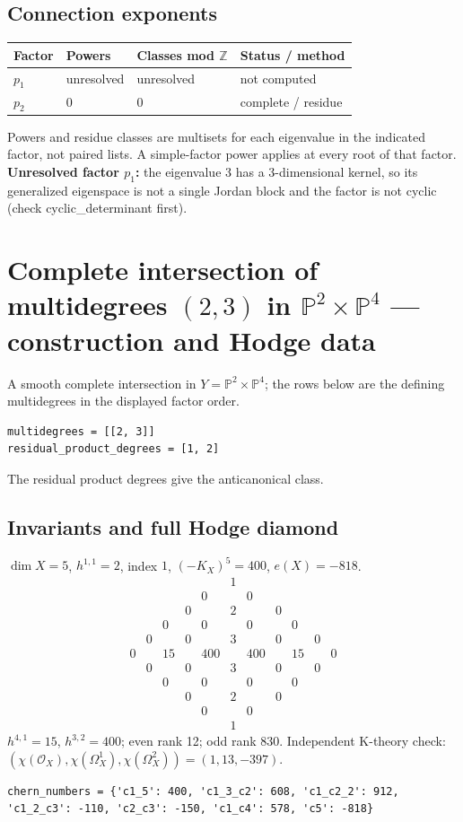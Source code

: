 \documentclass[10pt,a4paper]{article}
\begin{document}
\subsection*{Connection exponents}
\begin{center}\begin{tabular}{llll}\toprule Factor & Powers & Classes mod $\mathbb Z$ & Status / method\\\midrule
$p_{1}$ & unresolved & unresolved & not computed\\
$p_{2}$ & $0$ & $0$ & complete / residue\\
\bottomrule\end{tabular}\end{center}
Powers and residue classes are multisets for each eigenvalue in the indicated factor, not paired lists. A simple-factor power applies at every root of that factor.
\textbf{Unresolved factor $p_{1}$:} the eigenvalue 3 has a 3-dimensional kernel, so its generalized eigenspace is not a single Jordan block and the factor is not cyclic (check cyclic\_determinant first).
\clearpage\section*{Complete intersection of multidegrees $(2,3)$ in $\mathbb P^{2}\times \mathbb P^{4}$ --- construction and Hodge data}\label{entry:PROD5-A02}
A smooth complete intersection in $Y=\mathbb P^{2}\times\mathbb P^{4}$; the rows below are the defining multidegrees in the displayed factor order.
\begin{lstlisting}
multidegrees = [[2, 3]]
residual_product_degrees = [1, 2]
\end{lstlisting}
The residual product degrees give the anticanonical class.
\subsection*{Invariants and full Hodge diamond}
$\dim X=5$, $h^{1,1}=2$, index $1$, $(-K_X)^5=400$, $e(X)=-818$.
\[\begin{array}{ccccccccccc}&&&&&1&&&&&\\&&&&0&&0&&&&\\&&&0&&2&&0&&&\\&&0&&0&&0&&0&&\\&0&&0&&3&&0&&0&\\0&&15&&400&&400&&15&&0\\&0&&0&&3&&0&&0&\\&&0&&0&&0&&0&&\\&&&0&&2&&0&&&\\&&&&0&&0&&&&\\&&&&&1&&&&&\end{array}\]
$h^{4,1}=15$, $h^{3,2}=400$; even rank 12; odd rank 830.
Independent K-theory check: $(\chi(\mathcal O_X),\chi(\Omega_X^1),\chi(\Omega_X^2))=(1, 13, -397)$.
\begin{lstlisting}
chern_numbers = {'c1_5': 400, 'c1_3_c2': 608, 'c1_c2_2': 912, 'c1_2_c3': -110, 'c2_c3': -150, 'c1_c4': 578, 'c5': -818}
\end{lstlisting}
\end{document}
